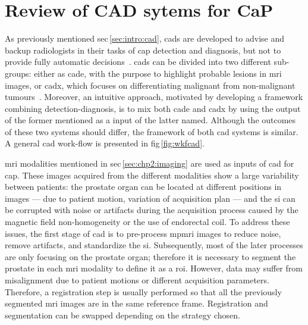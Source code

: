\chapter{Review of CAD sytems for CaP}\label{chap:3}
\ifpdf
    \graphicspath{{3_review/figures/}}
\else
    \graphicspath{{3_review/figures/}}
\fi



As previously mentioned \acs{sec}\,\ref{sec:intro:cad}, \acp{cad} are developed to advise and backup radiologists in their tasks of \ac{cap} detection and diagnosis, but not to provide fully automatic decisions~\cite{Giger2008}.
\acp{cad} can be divided into two different sub-groups: either as \ac{cade}, with the purpose to highlight probable lesions in \ac{mri} images, or \ac{cadx}, which focuses on differentiating malignant from non-malignant tumours~\cite{Giger2008}.
Moreover, an intuitive approach, motivated by developing a framework combining detection-diagnosis, is to mix both \ac{cade} and \ac{cadx} by using the output of the former mentioned as a input of the latter named.
Although the outcomes of these two systems should differ, the framework of both \ac{cad} systems is similar.
A general \ac{cad} work-flow is presented in \acs{fig}\,\ref{fig:wkfcad}.

\ac{mri} modalities mentioned in \acs{sec}\,\ref{sec:chp2:imaging} are used as inputs of \ac{cad} for \ac{cap}.
These images acquired from the different modalities show a large variability between patients: the prostate organ can be located at different positions in images --- due to patient motion, variation of acquisition plan --- and the \ac{si} can be corrupted with noise or artifacts during the acquisition process caused by the magnetic field non-homogeneity or the use of endorectal coil.
To address these issues, the first stage of \ac{cad} is to pre-process \ac{mpmri} images to reduce noise, remove artifacts, and standardize the \ac{si}.
Subsequently, most of the later processes are only focusing on the prostate organ; therefore it is necessary to segment the prostate in each \ac{mri} modality to define it as a \ac{roi}.
However, data may suffer from misalignment due to patient motions or different acquisition parameters.
Therefore, a registration step is usually performed so that all the previously segmented \ac{mri} images are in the same reference frame.
Registration and segmentation can be swapped depending on the strategy chosen.

